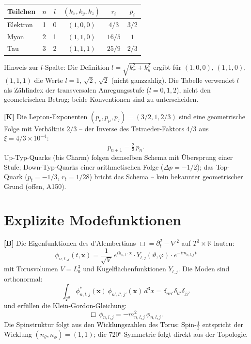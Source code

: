 \begin{center}
\renewcommand{\arraystretch}{1.3}
{\small
\begin{tabular}{lccccc}
\toprule
Teilchen & $n$ & $l$ & $(k_x,k_y,k_z)$ & $r_i$ & $p_i$ \\
\midrule
Elektron & 1 & 0 & $(1,0,0)$ & $4/3$ & $3/2$ \\
Myon     & 2 & 1 & $(1,1,0)$ & $16/5$ & $1$ \\
Tau      & 3 & 2 & $(1,1,1)$ & $25/9$ & $2/3$ \\
\bottomrule
\end{tabular}
}
\renewcommand{\arraystretch}{1.0}
\end{center}
Hinweis zur $l$-Spalte: Die Definition $l=\sqrt{k_x^2+k_y^2}$ ergibt für $(1,0,0)$, $(1,1,0)$, $(1,1,1)$ die Werte $l=1$, $\sqrt2$, $\sqrt2$ (nicht ganzzahlig). Die Tabelle verwendet $l$ als Zählindex der transversalen Anregungsstufe ($l=0,1,2$), nicht den geometrischen Betrag; beide Konventionen sind zu unterscheiden.

\textbf{[K]} Die Lepton-Exponenten $(p_e,p_\mu,p_\tau)=(3/2,1,2/3)$ sind eine
geometrische Folge mit Verhältnis $2/3$ -- der Inverse des Tetraeder-Faktors
$4/3$ aus $\xi=4/3\times10^{-4}$:
\[
  p_{n+1} = \tfrac23\,p_n.
\]
Up-Typ-Quarks (bis Charm) folgen demselben Schema mit Übersprung einer Stufe;
Down-Typ-Quarks einer arithmetischen Folge ($\Delta p=-1/2$); das Top-Quark
($p_t=-1/3$, $r_t=1/28$) bricht das Schema -- kein bekannter geometrischer Grund
(offen, A150).

\section{Explizite Modefunktionen}

\textbf{[B]} Die Eigenfunktionen des d'Alembertians $\Box=\partial_t^2-\nabla^2$
auf $T^3\times\mathbb R$ lauten:
\[
  \boxed{\;
    \phi_{n,l,j}(t,\mathbf x)
    = \frac{1}{\sqrt V}\,
      e^{i\mathbf k_{n,l}\cdot\mathbf x}\cdot
      Y_{l,j}(\vartheta,\varphi)\cdot
      e^{-im_{n,l,j}\,t}
  \;}
\]
mit Torusvolumen $V=L_0^3$ und Kugelflächenfunktionen $Y_{l,j}$. Die Moden
sind orthonormal:
\[
  \int_{T^3}\phi_{n,l,j}^*(\mathbf x)\,\phi_{n',l',j'}(\mathbf x)\,d^3x
  = \delta_{nn'}\delta_{ll'}\delta_{jj'}
\]
und erfüllen die Klein-Gordon-Gleichung:
\[
  \Box\,\phi_{n,l,j} = -m_{n,l,j}^2\,\phi_{n,l,j}.
\]
Die Spinstruktur folgt aus den Wicklungszahlen des Torus: Spin-$\tfrac12$
entspricht der Wicklung $(n_\theta,n_\phi)=(1,1)$; die 720°-Symmetrie folgt
direkt aus der Topologie.

